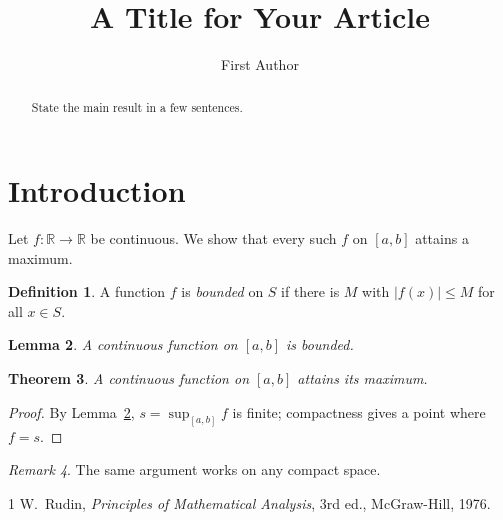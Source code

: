\documentclass{amsart}
\title{A Title for Your Article}
\author{First Author}
\newtheorem{theorem}{Theorem}[section]
\newtheorem{lemma}[theorem]{Lemma}
\theoremstyle{definition}
\newtheorem{definition}[theorem]{Definition}
\theoremstyle{remark}
\newtheorem{remark}[theorem]{Remark}
\begin{document}
\begin{abstract}
State the main result in a few sentences.
\end{abstract}
\maketitle

\section{Introduction}
Let $f\colon \mathbb{R}\to\mathbb{R}$ be continuous. We show that every such $f$ on $[a,b]$ attains a maximum.

\begin{definition}
A function $f$ is \emph{bounded} on $S$ if there is $M$ with $|f(x)|\le M$ for all $x\in S$.
\end{definition}

\begin{lemma}\label{lem:bounded}
A continuous function on $[a,b]$ is bounded.
\end{lemma}

\begin{theorem}
A continuous function on $[a,b]$ attains its maximum.
\end{theorem}

\begin{proof}
By Lemma~\ref{lem:bounded}, $s=\sup_{[a,b]} f$ is finite; compactness gives a point where $f=s$.
\end{proof}

\begin{remark}
The same argument works on any compact space.
\end{remark}


\begin{thebibliography}{1}
 W.~Rudin, \emph{Principles of Mathematical Analysis}, 3rd ed., McGraw-Hill, 1976.
\end{thebibliography}
\end{document}
